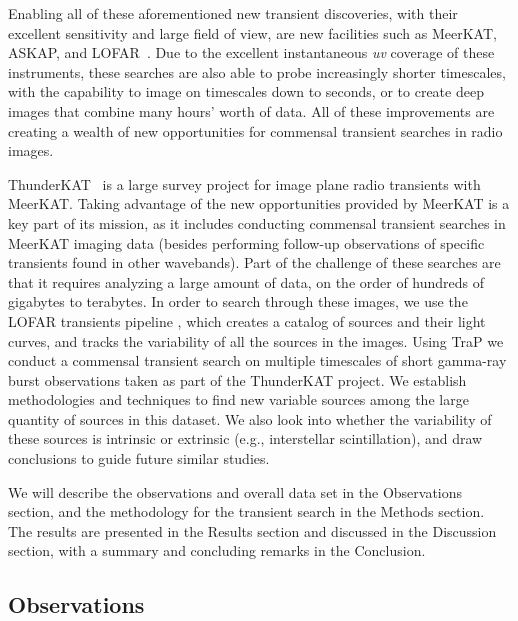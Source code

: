\documentclass[12pt]{article}
\begin{document}
Enabling all of these aforementioned new transient discoveries, with their excellent sensitivity and large field of view, are new facilities such as MeerKAT, ASKAP, and LOFAR~\citep{2009IEEEP..97.1522J,2008ExA....22..151J,2013A&A...556A...2V}. Due to the excellent instantaneous {\it uv} coverage of these instruments, these searches are also able to probe increasingly shorter timescales, with the capability to image on timescales down to seconds, or to create deep images that combine many hours' worth of data. All of these improvements are creating a wealth of new opportunities for commensal transient searches in radio images. 

ThunderKAT~\citep{2016mks..confE..13F} is a large survey project for image plane radio transients with MeerKAT. Taking advantage of the new opportunities provided by MeerKAT is a key part of its mission, as it includes conducting commensal transient searches in MeerKAT imaging data (besides performing follow-up observations of specific transients found in other wavebands). Part of the challenge of these searches are that it requires analyzing a large amount of data, on the order of hundreds of gigabytes to terabytes. In order to search through these images, we use the LOFAR transients pipeline \citep[{\sc TraP};][]{2015A&C....11...25S}, which creates a catalog of sources and their light curves, and tracks the variability of all the sources in the images. Using TraP we conduct a commensal transient search on multiple timescales of short gamma-ray burst observations taken as part of the ThunderKAT project. We establish methodologies and techniques to find new variable sources among the large quantity of sources in this dataset. We also look into whether the variability of these sources is intrinsic or extrinsic (e.g., interstellar scintillation), and draw conclusions to guide future similar studies. 

We will describe the observations and overall data set in the Observations section, and the methodology for the transient search in the Methods section. The results are presented in the Results section and discussed in the Discussion section, with a summary and concluding remarks in the Conclusion.

\subsection{Observations}
\end{document}

